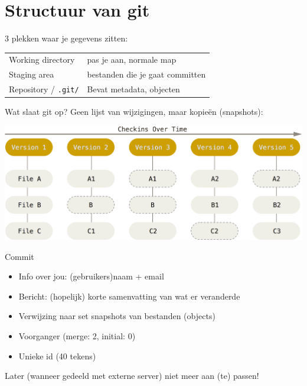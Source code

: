 \section{Structuur van git}
\begin{frame}
	3 plekken waar je gegevens zitten:\\
	\begin{tabular}{ll}
		 Working directory			& pas je aan, normale map\\
		 Staging area				& bestanden die je gaat committen\\
		 Repository / \texttt{.git/}&Bevat metadata, objecten
	\end{tabular}
\end{frame}

\begin{frame}{Wat slaat git op?}
	Geen lijst van wijzigingen, maar kopie\"en (snapshots):
	\begin{center}
		\includegraphics[width=\textwidth]{images/snapshots.png}
	\end{center}
\end{frame}

\begin{frame}{Commit}
	\begin{itemize}
		\item Info over jou: (gebruikers)naam + email
		\item Bericht: (hopelijk) korte samenvatting van wat er veranderde
		\item Verwijzing naar set snapshots van bestanden (objects)
		\item Voorganger (merge: 2, initial: 0)
		\item Unieke id (40 tekens)
	\end{itemize}
	\alert{Later (wanneer gedeeld met externe server) niet meer aan (te) passen!}
\end{frame}

